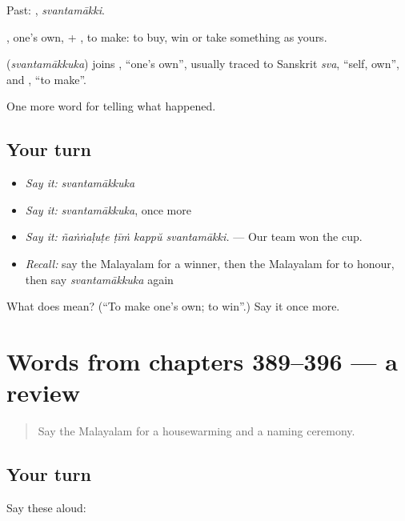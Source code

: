Past: , \emph{svantamākki}.

, one's own, + , to make: to buy, win or take something as yours.

\begin{cousinweb}
\textbf{} (\emph{svantamākkuka}) joins , \textquotedblleft{}one's own\textquotedblright{}, usually traced to Sanskrit \emph{sva}, \textquotedblleft{}self, own\textquotedblright{}, and , \textquotedblleft{}to make\textquotedblright{}.
\end{cousinweb}

\begin{grammarlens}[title={What you've built}]
One more word for telling what happened.
\end{grammarlens}

\subsection*{Your turn}
\begin{itemize}
\raggedright
  \item \emph{Say it:} \emph{svantamākkuka}
  \item \emph{Say it:} \emph{svantamākkuka}, once more
  \item \emph{Say it:} \emph{ñaṅṅaḷuṭe ṭīṁ kappŭ svantamākki.} — Our team won the cup.
  \item \emph{Recall:} say the Malayalam for a winner, then the Malayalam for to honour, then say \emph{svantamākkuka} again
\end{itemize}

\begin{tcolorbox}[breakable,colback=teal!4,colframe=teal!35!black,title={Before you move on}]
What does  mean? (\textquotedblleft{}To make one's own; to win\textquotedblright{}.) Say it once more.
\end{tcolorbox}
\section[(dialogue)]{Words from chapters 389–396 — a review}

\label{lesson:ML-R396-review-389-396}



\begin{quote}
Say the Malayalam for a housewarming and a naming ceremony.
\end{quote}

\subsection*{Your turn}
Say these aloud:

